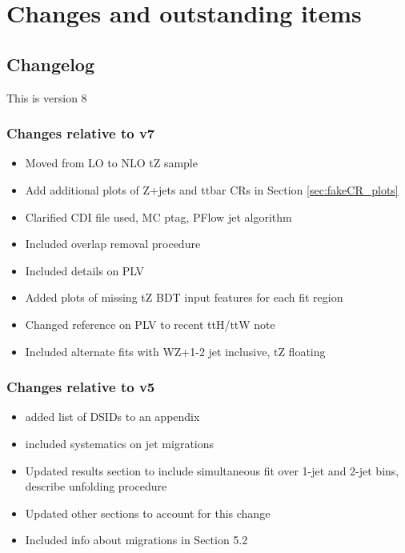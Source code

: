 \documentclass[NOTE, atlasdraft=true, texlive=2016, UKenglish]{\ATLASLATEXPATH atlasdoc}
\begin{document}
\maketitle

\tableofcontents

\clearpage

\section{Changes and outstanding items}
\label{sec:changes}

\subsection{Changelog}

This is version 8

\subsubsection{Changes relative to v7}
\begin{itemize}
  \item Moved from LO to NLO tZ sample
  \item Add additional plots of Z+jets and ttbar CRs in Section \ref{sec:fakeCR_plots}
  \item Clarified CDI file used, MC ptag, PFlow jet algorithm
  \item Included overlap removal procedure
  \item Included details on PLV
  \item Added plots of missing tZ BDT input features for each fit region
  \item Changed reference on PLV to recent ttH/ttW note
  \item Included alternate fits with WZ+1-2 jet inclusive, tZ floating
\end{itemize}

\subsubsection{Changes relative to v5}
\begin{itemize}
  \item added list of DSIDs to an appendix
  \item included systematics on jet migrations
  \item Updated results section to include simultaneous fit over 1-jet and 2-jet bins, describe unfolding procedure
  \item Updated other sections to account for this change
  \item Included info about migrations in Section 5.2
\end{itemize}
\end{document}
